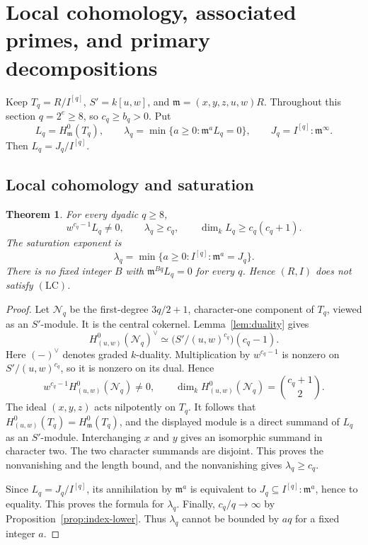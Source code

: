 \documentclass[11pt,a4paper,reqno]{amsart}
\numberwithin{equation}{section}
\theoremstyle{plain}
\newtheorem{theorem}{Theorem}[section]
\theoremstyle{definition}
\theoremstyle{remark}
\newcommand{\mm}{\mathfrak m}
\begin{document}
\section{Local cohomology, associated primes, and primary decompositions}\label{sec:primary}

Keep $T_q=R/I^{[q]}$, $S'=k[u,w]$, and
$\mm=(x,y,z,u,w)R$. Throughout this section $q=2^e\geq8$, so $c_q\geq b_q>0$.
Put
\[
L_q=H^0_\mm(T_q),\qquad
\lambda_q=\min\{a\geq0:\mm^aL_q=0\},\qquad
J_q=I^{[q]}:\mm^\infty.
\]
Then $L_q=J_q/I^{[q]}$.

\subsection{Local cohomology and saturation}
\begin{theorem}\label{thm:LC}
For every dyadic $q\geq8$,
\[
w^{c_q-1}L_q\ne0,\qquad
\lambda_q\geq c_q,\qquad
\dim_kL_q\geq c_q(c_q+1).
\]
The saturation exponent is
\[
\lambda_q=\min\{a\geq0:I^{[q]}:\mm^a=J_q\}.
\]
There is no fixed integer $B$ with $\mm^{Bq}L_q=0$ for every $q$.
Hence $(R,I)$ does not satisfy $(\mathrm{LC})$.
\end{theorem}
\begin{proof}
Let $\mathcal N_q$ be the first-degree $3q/2+1$, character-one component
of $T_q$, viewed as an $S'$-module. It is the central cokernel.
Lemma~\ref{lem:duality} gives
\[
H^0_{(u,w)}(\mathcal N_q)^\vee
\simeq \bigl(S'/(u,w)^{c_q}\bigr)(c_q-1).
\]
Here $(-)^\vee$ denotes graded $k$-duality. Multiplication by
$w^{c_q-1}$ is nonzero on $S'/(u,w)^{c_q}$, so it is nonzero on its
dual. Hence
\[
w^{c_q-1}H^0_{(u,w)}(\mathcal N_q)\ne0,
\qquad
\dim_kH^0_{(u,w)}(\mathcal N_q)=\binom{c_q+1}{2}.
\]
The ideal $(x,y,z)$ acts nilpotently on $T_q$. It follows that
$H^0_{(u,w)}(T_q)=H^0_\mm(T_q)$, and the displayed module is a direct
summand of $L_q$ as an $S'$-module. Interchanging $x$ and $y$ gives an
isomorphic summand in character two. The two character summands are
disjoint. This proves the nonvanishing and the length bound, and the
nonvanishing gives $\lambda_q\geq c_q$.

Since $L_q=J_q/I^{[q]}$, its annihilation by $\mm^a$ is equivalent to
$J_q\subseteq I^{[q]}:\mm^a$, hence to equality. This proves the
formula for $\lambda_q$. Finally,
$c_q/q\to\infty$ by Proposition~\ref{prop:index-lower}. Thus $\lambda_q$ cannot
be bounded by $aq$ for a fixed integer $a$.
\end{proof}
\end{document}
